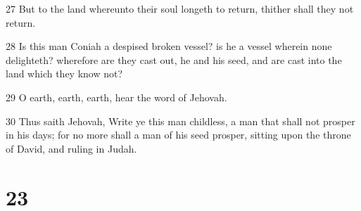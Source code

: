 \par 27 But to the land whereunto their soul longeth to return, thither shall they not return.
\par 28 Is this man Coniah a despised broken vessel? is he a vessel wherein none delighteth? wherefore are they cast out, he and his seed, and are cast into the land which they know not?
\par 29 O earth, earth, earth, hear the word of Jehovah.
\par 30 Thus saith Jehovah, Write ye this man childless, a man that shall not prosper in his days; for no more shall a man of his seed prosper, sitting upon the throne of David, and ruling in Judah.

\chapter{23}

